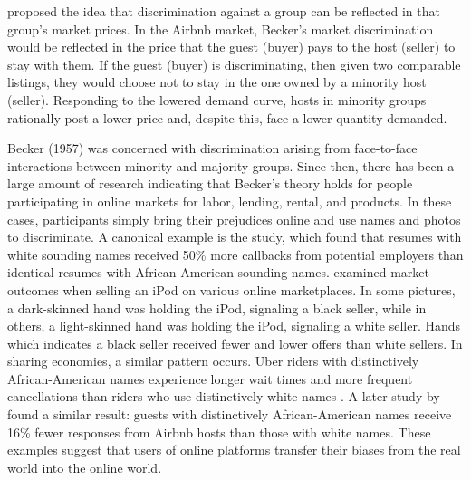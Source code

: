 \cite{becker} proposed the idea that discrimination against a group can be reflected in that group's market prices. In the Airbnb market, Becker's market discrimination would be reflected in the price that the guest (buyer) pays to the host (seller) to stay with them. If the guest (buyer) is discriminating, then given two comparable listings, they would choose not to stay in the one owned by a minority host (seller). Responding to the lowered demand curve, hosts in minority groups rationally post a lower price and, despite this, face a lower quantity demanded. 

Becker (1957) was concerned with discrimination arising from face-to-face interactions between minority and majority groups. Since then, there has been a large amount of research indicating that Becker's theory holds for people participating in online markets for labor, lending, rental, and products. In these cases, participants simply bring their prejudices online and use names and photos to discriminate. A canonical example is the \cite{bertrand} study, which found that resumes with white sounding names received 50\% more callbacks from potential employers than identical resumes with African-American sounding names. \cite{doleac} examined market outcomes when selling an iPod on various online marketplaces. In some pictures, a dark-skinned hand was holding the iPod, signaling a black seller, while in others, a light-skinned hand was holding the iPod, signaling a white seller. Hands which indicates a black seller received fewer and lower offers than white sellers. In sharing economies, a similar pattern occurs. Uber riders with distinctively African-American names experience longer wait times and more frequent cancellations than riders who use distinctively white names \citep{knittel}. A later study by \cite{edelman2} found a similar result: guests with distinctively African-American names receive 16\% fewer responses from Airbnb hosts than those with white names. These examples suggest that users of online platforms transfer their biases from the real world into the online world.  

